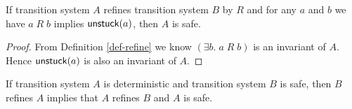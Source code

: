 \begin{lemma} \label{lemma-refine-safety}
  If transition system $A$ refines transition system $B$ by $R$ and for any $a$ and $b$ we have $a\;R\;b$ implies $\text{\textsf{unstuck}}(a)$, then $A$ is safe.
\end{lemma}
\begin{proof}
  From Definition \ref{def-refine} we know $(\exists b.\;a\;R\;b)$ is an invariant of $A$. Hence $\text{\textsf{unstuck}}(a)$ is also an invariant of $A$.
\end{proof}

\begin{lemma} \label{lemma-reverse}
  If transition system $A$ is deterministic and transition system $B$ is safe, then $B$ refines $A$ implies that $A$ refines $B$ and $A$ is safe.
\end{lemma}
